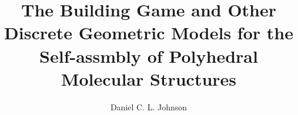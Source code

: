 \documentclass[12pt,twoside]{report}  %
\title{
The Building Game and Other Discrete Geometric Models for the Self-assmbly of Polyhedral Molecular Structures 
}
\author{Daniel C. L. Johnson}
\begin{document}
\doublespacing
\begin{preliminaries}
\maketitle

\copyrightpage

\begin{signature}
\end{signature}

\begin{vita}
  
\end{vita}

\begin{acknowledgments}
  
\end{acknowledgments}

\begin{abstract}
  
  \thispagestyle{empty}
\end{abstract}

\begin{spacing}{1}
  \tableofcontents
  \clearpage{\pagestyle{empty}\cleardoublepage}

  \footnotesize
  \fontsize{11.5pt}{12.5pt}\selectfont
  \listoftables
  \clearpage{\pagestyle{empty}\cleardoublepage}

  \listoffigures
  \clearpage{\pagestyle{empty}\cleardoublepage}
  \normalsize
\end{spacing}

\end{preliminaries}

\pagestyle{myheadings}

\newtheorem{mythm}{Theorem}
\newtheorem{mylem}{Lemma}
\newtheorem{mycor}{Corollary}
\newtheorem{mydef}{Definition}

\newcommand{\colorA}{white}
\newcommand{\colorB}{black}
\newcommand{\colorAsm}{w}
\newcommand{\colorBsm}{b}
\newcommand{\poly}{$\mathscr{P}$}
\newcommand{\Poly}{\mathscr{P}}
\newcommand{\PolyGraph}{\textswab{G}_\mathscr{P}}
\newcommand{\faceset}{F\left(\mathscr{P}\right)}
\newcommand{\spc}{ }
\newcommand{\xj}{$x^j$}
\newcommand{\xk}{$x^k$}
\newcommand{\Sjk}{$S_{jk}$}
\newcommand{\Skj}{$S_{kj}$}
\newcommand{\G}{{G}}
\end{document}
